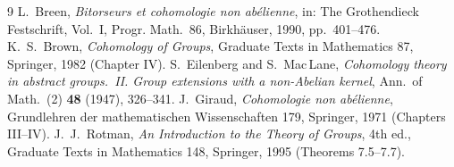\documentclass[11pt]{article}
\theoremstyle{definition}
\begin{document}
\begin{thebibliography}{9}
 L.~Breen, \emph{Bitorseurs et cohomologie non abélienne}, in: The Grothendieck
Festschrift, Vol.~I, Progr. Math.\ 86, Birkhäuser, 1990, pp.~401--476.
 K.~S.~Brown, \emph{Cohomology of Groups}, Graduate Texts in Mathematics 87,
Springer, 1982 (Chapter IV).
 S.~Eilenberg and S.~Mac\,Lane, \emph{Cohomology theory in abstract groups.~II.
Group extensions with a non-Abelian kernel}, Ann.\ of Math.\ (2) \textbf{48} (1947), 326--341.
 J.~Giraud, \emph{Cohomologie non abélienne}, Grundlehren der mathematischen
Wissenschaften 179, Springer, 1971 (Chapters III--IV).
 J.~J.~Rotman, \emph{An Introduction to the Theory of Groups}, 4th ed., Graduate
Texts in Mathematics 148, Springer, 1995 (Theorems 7.5--7.7).
\end{thebibliography}
\end{document}
